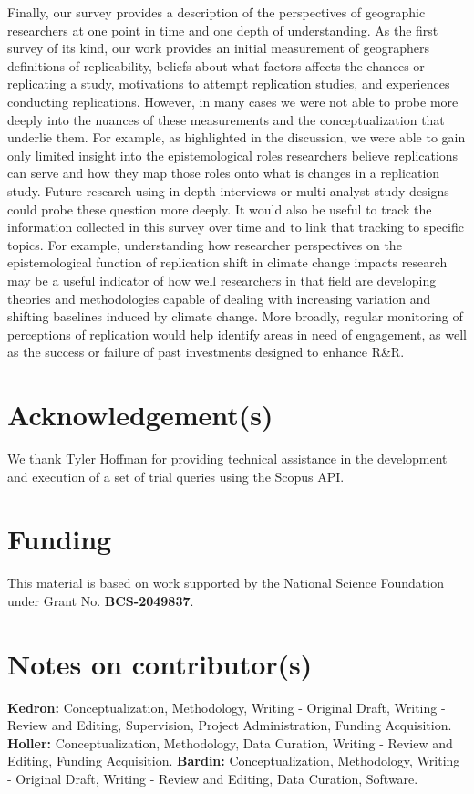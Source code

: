 \documentclass[]{interact}
\theoremstyle{plain}%
\theoremstyle{definition}
\theoremstyle{remark}
\begin{document}
Finally, our survey provides a description of the perspectives of geographic researchers at one point in time and one depth of understanding.
As the first survey of its kind, our work provides an initial measurement of geographers definitions of replicability, beliefs about what factors affects the chances
or replicating a study, motivations to attempt replication studies, and experiences
conducting replications. 
However, in many cases we were not able to probe more deeply into the nuances of these measurements and the conceptualization that underlie them.
For example, as highlighted in the discussion, we were able to gain only limited insight into the epistemological roles researchers believe replications can serve and how they map those roles onto what is changes in a replication study.
Future research using in-depth interviews or multi-analyst study designs could probe these question more deeply. 
It would also be useful to track the information collected in this survey over time and to link that tracking to specific topics. 
For example, understanding how researcher perspectives on the epistemological function of replication shift in climate change impacts research may be a useful indicator of how well researchers in that field are developing theories and methodologies capable of dealing with increasing variation and shifting baselines induced by climate change.
More broadly, regular monitoring of perceptions of replication would help identify areas in need of engagement, as well as the success or failure of past investments designed to enhance R\&R. 





\theendnotes


\section*{Acknowledgement(s)}
We thank Tyler Hoffman for providing technical assistance in the development and execution of a set of trial queries using the Scopus API.

\section*{Funding}
This material is based on work supported by the National Science Foundation under Grant No. \textbf{BCS-2049837}.

\section*{Notes on contributor(s)}
\textbf{Kedron:} Conceptualization, Methodology, Writing - Original Draft, Writing - Review and Editing, Supervision, Project Administration, Funding Acquisition. \textbf{Holler:} Conceptualization, Methodology, Data Curation, Writing - Review and Editing, Funding Acquisition. \textbf{Bardin:} Conceptualization, Methodology, Writing - Original Draft, Writing - Review and Editing, Data Curation, Software.
\end{document}
